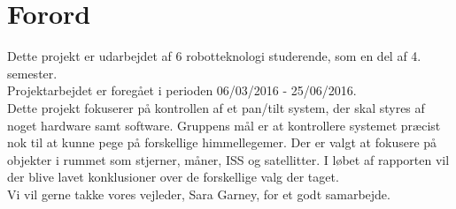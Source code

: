 \section*{Forord}

Dette projekt er udarbejdet af 6 robotteknologi studerende, som en del af 4. semester.\\ Projektarbejdet er foregået i perioden 06/03/2016 - 25/06/2016. 
\\
Dette projekt fokuserer på kontrollen af et pan/tilt system, der skal styres af noget hardware samt software. Gruppens mål er at kontrollere systemet præcist nok til at kunne pege på forskellige himmellegemer. Der er valgt at fokusere på objekter i rummet som stjerner, måner, ISS og satellitter. I løbet af rapporten vil der blive lavet konklusioner over de forskellige valg der taget.
\\
Vi vil gerne takke vores vejleder, Sara Garney, for et godt samarbejde.